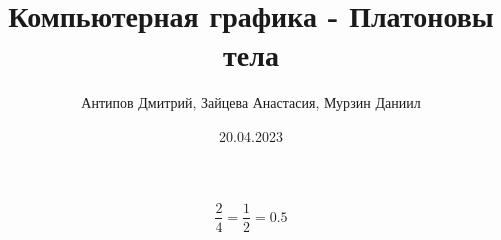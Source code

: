 \documentclass[12pt, a4paper]{article}
\title{Компьютерная графика - Платоновы тела}
\author{Антипов Дмитрий, Зайцева Анастасия, Мурзин Даниил}
\date{20.04.2023}
\begin{document}
\maketitle

	\[ \frac{2}{4} = \frac{1}{2} = 0.5 \]
\end{document}

